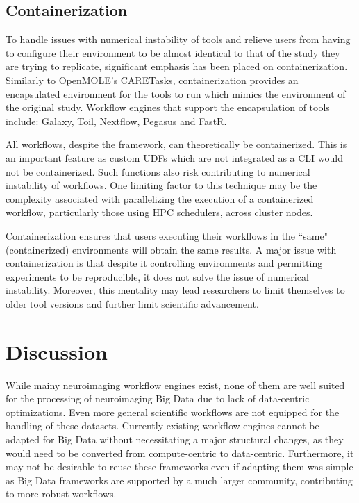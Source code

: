         \subsection{Containerization}\label{repcont}

            To handle issues with numerical instability of tools and relieve 
            users from
            having to configure their environment to be almost identical to 
            that of the study they are trying to replicate, significant 
            emphasis has been placed on containerization. Similarly to 
            OpenMOLE's CARETasks, containerization provides an encapsulated
            environment for the tools to run which mimics the environment of 
            the original study. Workflow engines that support the encapsulation of
            tools include: Galaxy, Toil, Nextflow, Pegasus and FastR. 

            All workflows, despite the framework, can theoretically be 
            containerized. This is an important feature as custom UDFs which 
            are not integrated as a CLI would not be containerized. Such 
            functions also risk contributing to numerical instability of 
            workflows. One limiting factor to this technique may be the complexity
            associated with parallelizing the execution of a containerized 
            workflow, particularly those using HPC schedulers, across cluster 
            nodes.  

            Containerization ensures that users executing their 
            workflows in the ``same" (containerized) environments will obtain the same results.
            A major issue with containerization is that despite it controlling
            environments and permitting experiments to be reproducible, it does
            not solve the issue of numerical instability. Moreover, this 
            mentality may lead researchers to limit themselves to older tool 
            versions and further limit scientific advancement.
    
    
    \section{Discussion}
    
        While mainy neuroimaging workflow engines exist, none of them are well
        suited for the processing of neuroimaging Big Data due to lack of data-centric optimizations. Even more general
        scientific workflows are not equipped for the handling of these datasets.
        Currently existing workflow engines cannot be adapted for Big Data without
        necessitating a major structural changes, as they would need to be converted
        from compute-centric to data-centric. Furthermore, it may not be desirable
        to reuse these frameworks even if adapting them was simple as Big Data 
        frameworks are supported by a much larger community, contributing to 
        more robust workflows.

